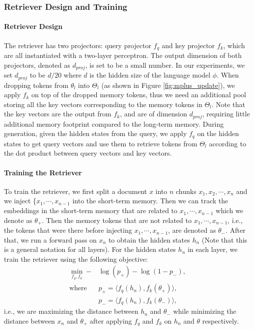 \vspace{-5pt}
\subsubsection{Retriever Design and Training}
\vspace{-5pt}
\paragraph{Retriever Design}
The retriever has two projectors: query projector $f_q$ and key projector $f_k$, which are all instantiated with a two-layer perceptron. The output dimension of both projectors, denoted as $d_{proj}$, is set to be a small number. In our experiments, we set $d_{proj}$ to be $d/20$ where $d$ is the hidden size of the language model $\phi$. When dropping tokens from $\theta_l$ into $\Theta_l$ (as shown in Figure \ref{fig:mplus_update}), we apply $f_k$ on top of the dropped memory tokens, thus we need an additional pool storing all the key vectors corresponding to the memory tokens in $\Theta_l$. Note that the key vectors are the output from $f_k$, and are of dimension $d_{proj}$, requiring little additional memory footprint compared to the long-term memory.
During generation, given the hidden states from the query, we apply $f_q$ on the hidden states to get query vectors and use them to retrieve tokens from $\Theta_l$ according to the dot product between query vectors and key vectors. 

\vspace{-10pt}
\paragraph{Training the Retriever}
To train the retriever, we first split a document $x$ into $n$ chunks $x_1, x_2,\cdots, x_n$ and we inject \{$x_1, \cdots, x_{n-1}$ into the short-term memory. Then we can track the embeddings in the short-term memory that are related to $x_1,\cdots,x_{n-1}$ which we denote as $\theta_+$. Then the memory tokens that are not related to $x_1, \cdots, x_{n-1}$, i.e., the tokens that were there before injecting $x_1,\cdots,x_{n-1}$, are denoted as $\theta_-$. 
After that, we run a forward pass on $x_n$ to obtain the hidden states $h_n$ (Note that this is a general notation for all layers). For the hidden states $h_n$ in each layer, we train the retriever using the following objective:
\begin{align*}
    \min_{f_q, f_k} - & \log (p_+) - \log (1 - p_-), \\
    \textrm{where } & p_+ = \langle f_q(h_n), f_k(\theta_+) \rangle, \\
    &    p_- = \langle f_q(h_n), f_k(\theta_-) \rangle,
\end{align*}
i.e., we are maximizing the distance between $h_n$ and $\theta_-$ while minimizing the distance between $x_n$ and $\theta_+$ after applying $f_q$ and $f_k$ on $h_n$ and $\theta$ respectively. 

